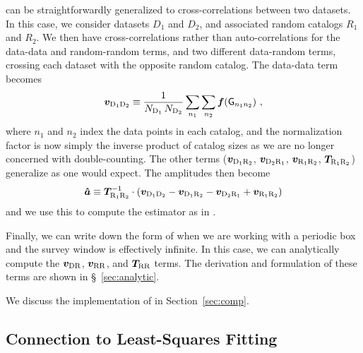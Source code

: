 \Est can be straightforwardly generalized to cross-correlations between two datasets.
In this case, we consider datasets $D_1$ and $D_2$, and associated random catalogs $R_1$ and $R_2$. 
We then have cross-correlations rather than auto-correlations for the data-data and random-random terms, and two different data-random terms, crossing each dataset with the opposite random catalog. 
The data-data term becomes 
\begin{equation}
    \bm{v}_\mathrm{D_1 D_2} \equiv \frac{1}{N_\mathrm{D_1}\,N_\mathrm{D_2}} \sum_{n_1} \sum_{n_2} \bm{f}(\mathsf{G}_{n_1 n_2}) ~,
\end{equation}
where $n_1$ and $n_2$ index the data points in each catalog, and the normalization factor is now simply the inverse product of catalog sizes as we are no longer concerned with double-counting.
The other terms ($\bm{v}_\mathrm{D_1 R_2}$, $\bm{v}_\mathrm{D_2 R_1}$, $\bm{v}_\mathrm{R_1 R_2}$, $\bm{T}_\mathrm{R_1 R_2}$) generalize as one would expect.
The amplitudes then become
\begin{equation}\displaystyle
    \bm{\hat a} \equiv \bm{T}_\mathrm{R_1 R_2}^{-1} \cdot (\bm{v}_\mathrm{D_1 D_2} - \bm{v}_\mathrm{D_1 R_2} - \bm{v}_\mathrm{D_2 R_1} + \bm{v}_\mathrm{R_1 R_2})
 \end{equation}
and we use this to compute the estimator as in .

Finally, we can write down the form of \est when we are working with a periodic box and the survey window is effectively infinite.
In this case, we can analytically compute the $\bm{v}_\mathrm{DR}$, $\bm{v}_\mathrm{RR}$, and $\bm{T}_\mathrm{RR}$ terms.
The derivation and formulation of these terms are shown in \S~\ref{sec:analytic}.

We discuss the implementation of \est in Section~\ref{sec:comp}.


\subsection{Connection to Least-Squares Fitting}
\label{sec:leastsq}


